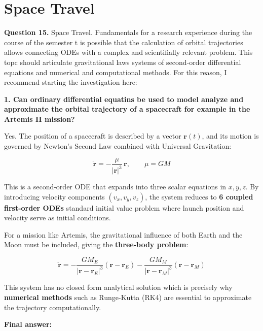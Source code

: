 \section*{Space Travel}
\noindent\textbf{Question 15.} Space Travel. Fundamentals for a research experience during the course of the semester t is possible that the calculation of orbital trajectories allows connecting ODEs with a complex and scientifially relevant problem. This topc should articulate gravitational laws systems of second-order differential equations and numerical and computational methods. For this reason, I recommend starting the investigation here:

\vspace{1em}

\textbf{1. Can ordinary differential equatins be used to model analyze and approximate the orbital trajectory of a spacecraft for example in the Artemis II mission?}

\begin{respuesta}
    Yes. The position of a spacecraft is described by a vector $\mathbf{r}(t)$, and its motion is governed by Newton's Second Law combined with Universal Gravitation:

    \[
    \ddot{\mathbf{r}} = -\frac{\mu}{|\mathbf{r}|^3}\,\mathbf{r}, \qquad \mu = GM
    \]

    This is a second-order ODE that expands into three scalar equations in $x, y, z$. By introducing velocity components $(v_x, v_y, v_z)$, the system reduces to \textbf{6 coupled first-order ODEs}  standard initial value problem where launch position and velocity serve as initial conditions.

    For a mission like Artemis, the gravitational influence of both Earth and the Moon must be included, giving the \textbf{three-body problem}:

    \[
    \ddot{\mathbf{r}} = -\frac{GM_E}{|\mathbf{r} - \mathbf{r}_E|^3}(\mathbf{r}-\mathbf{r}_E) - \frac{GM_M}{|\mathbf{r} - \mathbf{r}_M|^3}(\mathbf{r}-\mathbf{r}_M)
    \]

    This system has no closed form analytical solution which is precisely why \textbf{numerical methods} such as Runge-Kutta (RK4) are essential to approximate the trajectory computationally.

    \textbf{Final answer:}
    \begin{center}
    \end{center}
\end{respuesta}





